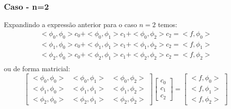 \documentclass{beamer}
\theoremstyle{mystyle}
\begin{document}
	\begin{frame}
		\frametitle{Caso - n=2}
		Expandindo a expressão anterior para o caso $ n=2 $ temos:
		\begin{gather*}
			<\phi_{0},\phi_{0}>c_{0} + <\phi_{0},\phi_{1}>c_{1} + <\phi_{0},\phi_{2}>c_{2} = <f,\phi_{0}>\\
			<\phi_{1},\phi_{0}>c_{0} + <\phi_{1},\phi_{1}>c_{1} + <\phi_{1},\phi_{2}>c_{2} = <f,\phi_{1}>\\
			<\phi_{2},\phi_{0}>c_{0} + <\phi_{2},\phi_{1}>c_{1} + <\phi_{2},\phi_{2}>c_{2} = <f,\phi_{2}>\\
		\end{gather*}
		ou de forma matricial:
		\begin{equation*}
			\left[ \begin{array}{ccc}
				<\phi_{0},\phi_{0}> & <\phi_{0},\phi_{1}> & <\phi_{0},\phi_{2}>\\
				<\phi_{1},\phi_{0}> & <\phi_{1},\phi_{1}> & <\phi_{1},\phi_{2}>\\
				<\phi_{2},\phi_{0}> & <\phi_{2},\phi_{1}> & <\phi_{2},\phi_{2}>
			\end{array}\right]
		    \left[ \begin{array}{c}
				c_{0}\\
				c_{1}\\
				c_{2}
			\end{array} \right]
	 		= \left[ \begin{array}{c}
				<f,\phi_{0}>\\
				<f,\phi_{1}>\\
				<f,\phi_{2}>
			\end{array} \right]
		\end{equation*}
	\end{frame}
 	
\end{document}
